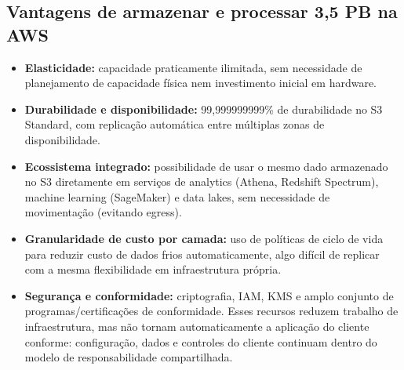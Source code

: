 \documentclass[11pt,a4paper]{article}
\begin{document}
\subsection{Vantagens de armazenar e processar 3,5 PB na AWS}
\begin{itemize}[leftmargin=*]
    \item \textbf{Elasticidade:} capacidade praticamente ilimitada, sem necessidade de planejamento de capacidade física nem investimento inicial em hardware.
    \item \textbf{Durabilidade e disponibilidade:} 99,999999999\% de durabilidade no S3 Standard, com replicação automática entre múltiplas zonas de disponibilidade.
    \item \textbf{Ecossistema integrado:} possibilidade de usar o mesmo dado armazenado no S3 diretamente em serviços de analytics (Athena, Redshift Spectrum), machine learning (SageMaker) e data lakes, sem necessidade de movimentação (evitando egress).
    \item \textbf{Granularidade de custo por camada:} uso de políticas de ciclo de vida para reduzir custo de dados frios automaticamente, algo difícil de replicar com a mesma flexibilidade em infraestrutura própria.
    \item \textbf{Segurança e conformidade:} criptografia, IAM, KMS e amplo conjunto de programas/certificações de conformidade. Esses recursos reduzem trabalho de infraestrutura, mas não tornam automaticamente a aplicação do cliente conforme: configuração, dados e controles do cliente continuam dentro do modelo de responsabilidade compartilhada.
\end{itemize}
\end{document}
